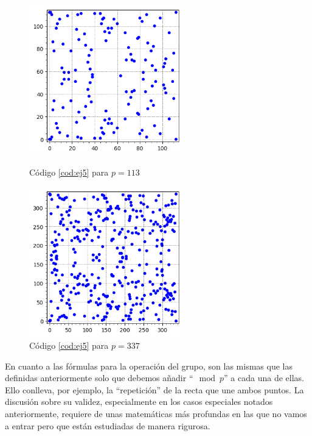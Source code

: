 \documentclass[11pt]{article}
\begin{document}
\begin{figure}[H]
	\centering
	\begin{minipage}[b]{0.4\textwidth}
	\centering
	\includegraphics[width=0.6\textwidth]{EC_F_113}
	\caption{Código \ref{cod:ej5} para $ p = 113 $}
	\label{fig:ej5}
	\end{minipage}
	\begin{minipage}[b]{0.4\textwidth}
		\centering
	\includegraphics[width=0.6\textwidth]{EC_F_337}
	\caption{Código \ref{cod:ej5} para $ p = 337 $}
	\label{fig:ej6}
	\end{minipage}
\end{figure}

En cuanto a las fórmulas para la operación del grupo, son las mismas que las definidas anteriormente solo que debemos añadir ``$ \mod p $'' a cada una de ellas. Ello conlleva, por ejemplo, la ``repetición'' de la recta que une ambos puntos. La discusión sobre su validez, especialmente en los casos especiales notados anteriormente, requiere de unas matemáticas más profundas en las que no vamos a entrar pero que están estudiadas de manera rigurosa. %
\end{document}
